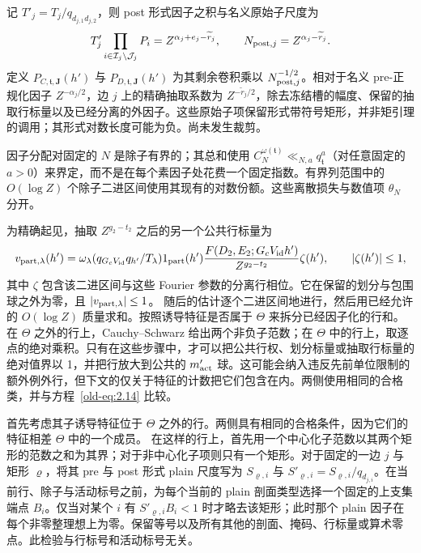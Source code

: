 记 \(T'_j=T_j/q_{d_{j,1}d_{j,2}}\)，则 post 形式因子之积与名义原始子尺度为
\begin{equation}
 T'_j\prod_{i\in\mathcal I_j\setminus\mathcal J_j}P_i
   =Z^{\alpha_j+e_j-\widetilde r_j},\qquad
 N_{{\rm post},j}=Z^{\alpha_j-\widetilde r_j}.
 \label{eq:centered-raw-normalization}
\end{equation}
定义 \(P_{C,\mathfrak t,\mathbf J}(h')\) 与
\(P_{D,\mathfrak t,\mathbf J}(h')\) 为其剩余卷积乘以 \(N_{{\rm post},j}^{-1/2}\)。相对于名义 pre-正规化因子 \(Z^{-\alpha_j/2}\)，边 \(j\) 上的精确抽取系数为 \(Z^{-\widetilde r_j/2}\)，除去冻结槽的幅度、保留的抽取行标量以及已经分离的外因子。这些原始子项保留形式带符号矩形，并非矩引理的调用；其形式对数长度可能为负。尚未发生裁剪。

因子分配对固定的 \(N\) 是除子有界的；其总和使用 \(C_N^{\omega(\mathfrak t)}
\ll_{N,a}q_{\mathfrak t}^a\)（对任意固定的 \(a>0\)）来界定，而不是在每个素因子处花费一个固定指数。有界列范围中的 \(O(\log Z)\) 个除子二进区间使用其现有的对数份额。这些离散损失与数值项 \(\theta_N\) 分开。

为精确起见，抽取 \(Z^{g_2-t_2}\) 之后的另一个公共行标量为
\[
 v_{{\rm part},\lambda}(h')=
 \omega_\lambda(q_{G_cV_{\rm id}}q_{h'}/T_\lambda)
 1_{\rm part}(h')
 \frac{F(D_2,E_2;G_cV_{\rm id}h')}{Z^{g_2-t_2}}\zeta(h'),
 \qquad |\zeta(h')|\le1,
\]
其中 \(\zeta\) 包含该二进区间与这些 Fourier 参数的分离行相位。它在保留的划分与包围球之外为零，且 \(|v_{{\rm part},\lambda}|\le1\)。
随后的估计逐个二进区间地进行，然后用已经允许的 \(O(\log Z)\) 质量求和。按照诱导特征是否属于 \(\Theta\) 来拆分已经因子化的行和。在 \(\Theta\) 之外的行上，Cauchy--Schwarz 给出两个非负子范数；在 \(\Theta\) 中的行上，取逐点的绝对乘积。只有在这些步骤中，才可以把公共行权、划分标量或抽取行标量的绝对值界以 1，并把行放大到公共的 \(m'_{\rm act}\) 球。这可能会纳入违反先前单位限制的额外例外行，但下文的仅关于特征的计数把它们包含在内。两侧使用相同的合格类，并与方程~\eqref{old-eq:2.14} 比较。

首先考虑其子诱导特征位于 \(\Theta\) 之外的行。两侧具有相同的合格条件，因为它们的特征相差 \(\Theta\) 中的一个成员。
在这样的行上，首先用一个中心化子范数以其两个矩形的范数之和为其界；对于非中心化子项则只有一个矩形。对于固定的一边 \(j\) 与矩形 \(\varrho\)，将其 pre 与 post 形式 plain 尺度写为 \(S_{\varrho,i}\) 与 \(S'_{\varrho,i}=S_{\varrho,i}/q_{d_{j,i}}\)。在当前行、除子与活动标号之前，为每个当前的 plain 剖面类型选择一个固定的上支集端点 \(B_i\)。仅当对某个 \(i\) 有 \(S'_{\varrho,i}B_i<1\) 时才略去该矩形；此时那个 plain 因子在每个非零整理想上为零。保留等号以及所有其他的剖面、掩码、行标量或算术零点。此检验与行标号和活动标号无关。

